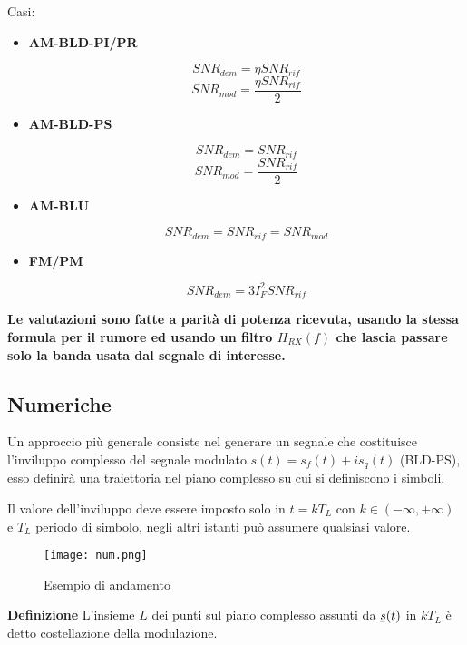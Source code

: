 \documentclass{article}
\newcommand{\df}{\noindent\textbf{Definizione} }
\newcommand{\ubar}[1]{\underaccent{\bar}{#1}}
\begin{document}
\noindent Casi:
\begin{itemize}
    \item \textbf{AM-BLD-PI/PR}

        $$SNR_{dem}=\eta SNR_{rif}$$
        $$SNR_{mod}=\frac{\eta SNR_{rif}}{2}$$

    \item \textbf{AM-BLD-PS}

        $$SNR_{dem}=SNR_{rif}$$
        $$SNR_{mod}=\frac{SNR_{rif}}{2}$$

    \item \textbf{AM-BLU}

        $$SNR_{dem}=SNR_{rif}=SNR_{mod}$$

    \item \textbf{FM/PM}

        $$SNR_{dem}=3I_F^2SNR_{rif}$$\newline

\end{itemize}

\noindent\textbf{Le valutazioni sono fatte a parità di potenza ricevuta, usando la stessa formula per il rumore ed usando un filtro $H_{RX}(f)$ che lascia passare solo la banda usata dal segnale di interesse.}\newline

\newpage

\subsection{Numeriche}

Un approccio più generale consiste nel generare un segnale che costituisce l'inviluppo complesso del segnale modulato $s(t)=s_f(t)+is_q(t)$ (BLD-PS), esso definirà una traiettoria nel piano complesso su cui si definiscono i simboli.\newline

\noindent Il valore dell'inviluppo deve essere imposto solo in $t=kT_L$ con $k\in(-\infty,+\infty)$ e $T_L$ periodo di simbolo, negli altri istanti può assumere qualsiasi valore.\newline

\begin{figure}[ht]
    \centering
    \texttt{[image: num.png]}
    \caption{Esempio di andamento}
    \label{fig:qam4}
\end{figure}

\df L'insieme $L$ dei punti sul piano complesso assunti da $\ubar{s}(t)$ in $kT_L$ è detto costellazione della modulazione.\newline
\end{document}
